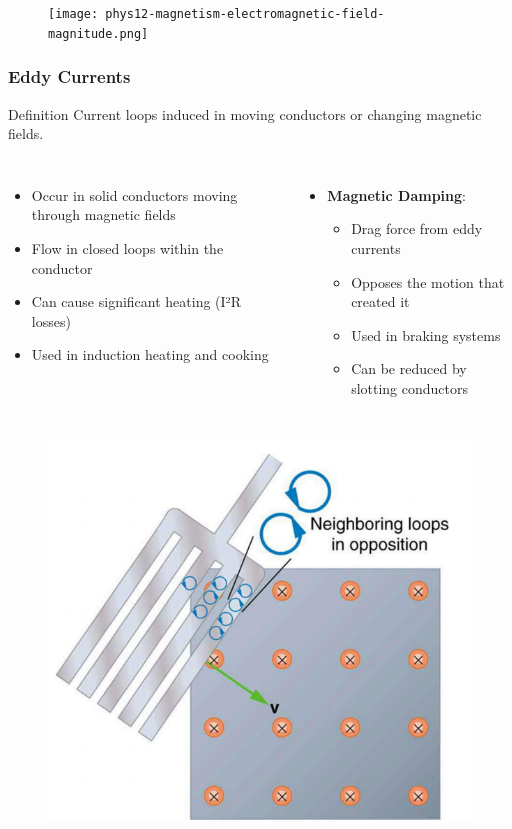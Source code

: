 \documentclass{beamer}
\begin{document}
\begin{frame}
\begin{figure}
    \centering
    \texttt{[image: phys12-magnetism-electromagnetic-field-magnitude.png]}
\end{figure}
\end{frame}

\begin{frame}
\frametitle{Eddy Currents}
\begin{block}{Definition}
Current loops induced in moving conductors or changing magnetic fields.
\end{block}

\begin{columns}
\begin{itemize}
\item Occur in solid conductors moving through magnetic fields
\item Flow in closed loops within the conductor
\item Can cause significant heating (I²R losses)
\item Used in induction heating and cooking
\end{itemize}

\begin{itemize}
\item \textbf{Magnetic Damping}:
\begin{itemize}
    \item Drag force from eddy currents
    \item Opposes the motion that created it
    \item Used in braking systems
    \item Can be reduced by slotting conductors
\end{itemize}
\end{itemize}
\end{columns}
\end{frame}

\begin{frame}
\begin{figure}
    \centering
    \includegraphics[width=0.5\linewidth]{phys12-magnetism-eddy-currents.png}
\end{figure}

\end{frame}
\end{document}
